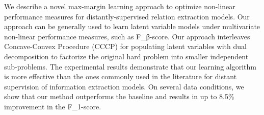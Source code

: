 We describe a novel max-margin learning approach to optimize non-linear performance measures for  distantly-supervised relation extraction models. Our approach can be generally used to learn latent variable models under multivariate non-linear performance measures, such as F\_β-score. Our approach interleaves Concave-Convex Procedure (CCCP) for populating  latent variables with dual decomposition to factorize the original hard problem into smaller independent sub-problems. The experimental results demonstrate that our learning algorithm is more effective than the ones commonly used in the literature for distant supervision of information extraction models. On several data conditions, we show that our method outperforms the baseline and results in up to 8.5\% improvement in the F\_1-score.
